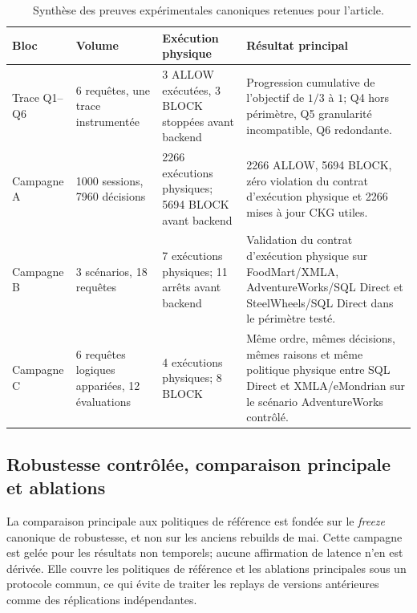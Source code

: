 \begin{table}[t]
\centering
\caption{Synthèse des preuves expérimentales canoniques retenues pour l'article.}
\label{tab:experimental-evidence-final}
\small
\begin{tabular}{p{}p{}p{}p{}}
\hline
Bloc & Volume & Exécution physique & Résultat principal \\
\hline
Trace Q1--Q6
& 6 requêtes, une trace instrumentée
& 3 ALLOW exécutées, 3 BLOCK stoppées avant backend
& Progression cumulative de l'objectif de $1/3$ à $1$; Q4 hors périmètre, Q5 granularité incompatible, Q6 redondante. \\

Campagne A
& 1000 sessions, 7960 décisions
& 2266 exécutions physiques; 5694 BLOCK avant backend
& 2266 ALLOW, 5694 BLOCK, zéro violation du contrat d'exécution physique et 2266 mises à jour CKG utiles. \\

Campagne B
& 3 scénarios, 18 requêtes
& 7 exécutions physiques; 11 arrêts avant backend
& Validation du contrat d'exécution physique sur FoodMart/XMLA, AdventureWorks/SQL Direct et SteelWheels/SQL Direct dans le périmètre testé. \\

Campagne C
& 6 requêtes logiques appariées, 12 évaluations
& 4 exécutions physiques; 8 BLOCK
& Même ordre, mêmes décisions, mêmes raisons et même politique physique entre SQL Direct et XMLA/eMondrian sur le scénario AdventureWorks contrôlé. \\
\hline
\end{tabular}
\end{table}


\subsection{Robustesse contrôlée, comparaison principale et ablations}

La comparaison principale aux politiques de référence est fondée sur le
\emph{freeze} canonique de robustesse, et non sur les anciens rebuilds de mai.
Cette campagne est gelée pour les résultats non temporels; aucune affirmation
de latence n'en est dérivée. Elle couvre les politiques de référence et les
ablations principales sous un protocole commun, ce qui évite de traiter les
replays de versions antérieures comme des réplications indépendantes.



